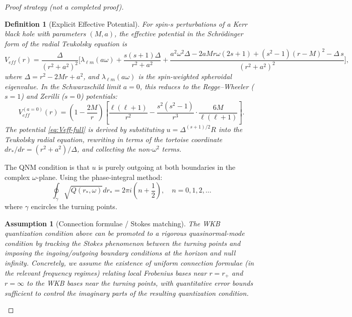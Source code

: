 \documentclass[12pt,a4paper]{article}
\newtheorem{definition}[theorem]{Definition}
\newtheorem{assumption}[theorem]{Assumption}
\begin{document}
\begin{proof}[Proof strategy (not a completed proof)]
\begin{definition}[Explicit Effective Potential]\label{def:Veff}
For spin-$s$ perturbations of a Kerr black hole with parameters $(M,a)$, the effective potential in the Schrödinger form of the radial Teukolsky equation is
\begin{equation}\label{eq:Veff-full}
V_{eff}(r) = \frac{\Delta}{(r^2+a^2)^2}\biggl[
  \lambda_{\ell m}(a\omega) + \frac{s(s+1)\Delta}{r^2+a^2}
  + \frac{a^2\omega^2\Delta - 2aMr\omega(2s+1) + (s^2-1)(r-M)^2 - \Delta\,s}{(r^2+a^2)^2}
\biggr],
\end{equation}
where $\Delta = r^2 - 2Mr + a^2$, and $\lambda_{\ell m}(a\omega)$ is the spin-weighted spheroidal eigenvalue. In the Schwarzschild limit $a=0$, this reduces to the Regge--Wheeler ($s=1$) and Zerilli ($s=0$) potentials:
\begin{equation}
V_{eff}^{(a=0)}(r) = \left(1 - \frac{2M}{r}\right)\left[\frac{\ell(\ell+1)}{r^2} - \frac{s^2(s^2-1)}{r^3}\cdot\frac{6M}{\ell(\ell+1)}\right].
\end{equation}
The potential \eqref{eq:Veff-full} is derived by substituting $u = \Delta^{(s+1)/2}R$ into the Teukolsky radial equation, rewriting in terms of the tortoise coordinate $dr_*/dr = (r^2+a^2)/\Delta$, and collecting the non-$\omega^2$ terms.
\end{definition}

The QNM condition is that $u$ is purely outgoing at both boundaries in the complex $\omega$-plane. Using the phase-integral method:
\begin{equation}
\oint_\gamma \sqrt{Q(r_*, \omega)} dr_* = 2\pi i \left(n + \frac{1}{2}\right), \quad n = 0, 1, 2, \ldots
\end{equation}
where $\gamma$ encircles the turning points.

\begin{assumption}[Connection formulae / Stokes matching]
The WKB quantization condition above can be promoted to a rigorous quasinormal-mode condition by tracking the Stokes phenomenon between the turning points and imposing the ingoing/outgoing boundary conditions at the horizon and null infinity. Concretely, we assume the existence of uniform connection formulae (in the relevant frequency regimes) relating local Frobenius bases near $r=r_+$ and $r=\infty$ to the WKB bases near the turning points, with quantitative error bounds sufficient to control the imaginary parts of the resulting quantization condition.
\end{assumption}


\end{proof}
\end{document}
